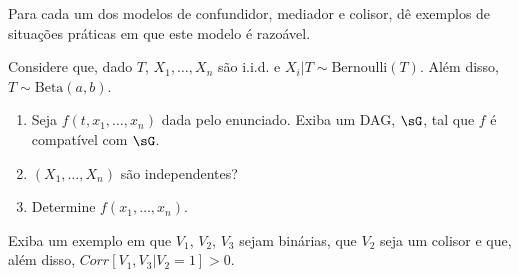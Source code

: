 \begin{exercise}
 Para cada um dos modelos de confundidor, mediador e colisor,
 dê exemplos de situações práticas em que este modelo é razoável.
\end{exercise}

\begin{exercise}
 Considere que, dado $T$, $X_1,\ldots,X_n$ são i.i.d. e
 $X_i|T \sim \text{Bernoulli}(T)$. Além disso,
 $T \sim \text{Beta}(a,b)$.
 \begin{enumerate}[label=(\alph*)]
  \item Seja $f(t,x_1,\ldots,x_n)$ dada pelo enunciado.
  Exiba um DAG, $\sG$, tal que $f$ é compatível com $\sG$.
  \item $(X_1,\ldots,X_n)$ são independentes?
  \item Determine $f(x_1,\ldots,x_n)$.
 \end{enumerate}
\end{exercise}

\begin{exercise}
 Exiba um exemplo em que $V_1$, $V_2$, $V_3$ sejam binárias,
 que $V_2$ seja um colisor e que, além disso,
 $Corr[V_1,V_3|V_2=1] > 0$.
\end{exercise}
